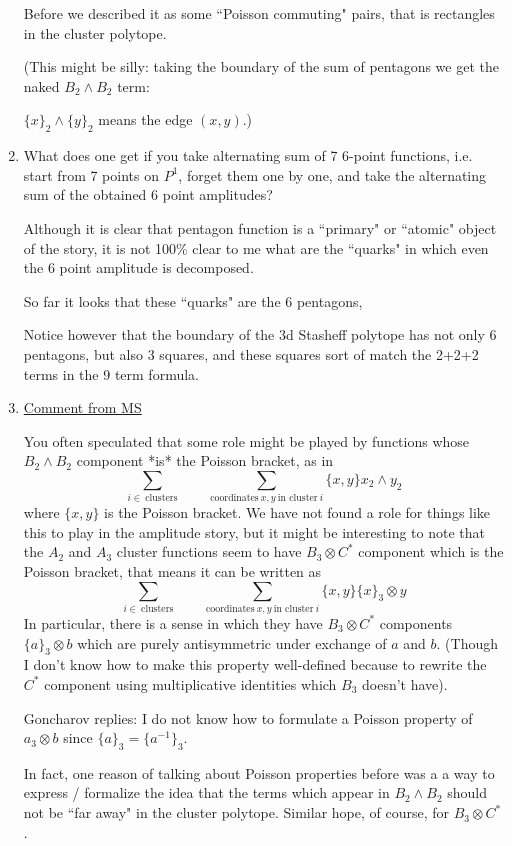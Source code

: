 \documentclass[12pt]{article}
\begin{document}
\begin{enumerate}
Before we described it as some ``Poisson commuting" pairs, that is
rectangles in the cluster polytope.

(This might be silly: taking the boundary of the sum of
pentagons we get the naked $B_2\wedge B_2$ term:

$\{x\}_2 \wedge \{y\}_2$ means the edge $(x,y)$.)

\item What does one get if you take alternating sum of
7 6-point functions, i.e. start from 7 points on $P^1$, forget them one
by one, and take the alternating sum of the obtained 6 point amplitudes?

Although it is clear that pentagon function is a
``primary" or ``atomic" object of the story,
it is not 100\% clear to me what are the ``quarks"
in which even the 6 point amplitude is decomposed.

So far it looks that these ``quarks" are the 6 pentagons,

Notice however that the boundary of the 3d Stasheff polytope has
not only 6 pentagons, but also 3 squares, and these squares
sort of match the 2+2+2 terms in the 9 term formula.

\item \underline{Comment from MS}

You often speculated that some role might be played by functions whose $B_2 \wedge B_2$ component *is*
the Poisson bracket, as in
$$
\sum_{i \in~\text{clusters}} \qquad \sum_{\text{coordinates}~x, y~\text{in cluster}~i} \{x,y\} {x}_2
\wedge {y}_2
$$
where $\{x,y\}$ is the Poisson bracket.  We have not found a role for
things like this to play in the amplitude story, but it might be
interesting to note that the $A_2$ and $A_3$ cluster functions seem to have
$B_3 \otimes C^*$ component which is the Poisson bracket, that means it
can be written as
$$
\sum_{i \in~\text{clusters}} \qquad \sum_{\text{coordinates}~x, y~\text{in cluster}~i} \{x,y\}
\{x\}_3 \otimes y
$$
In particular, there is a sense in which they have $B_3 \otimes C^*$
components $\{a\}_3 \otimes b$ which are purely antisymmetric under
exchange of $a$ and $b$.  (Though I don't know how to make this property
well-defined because to rewrite the $C^*$ component using multiplicative
identities which $B_3$ doesn't have).

Goncharov replies:  I do not know how to formulate a Poisson property of ${a}_3 \otimes b$
since $\{a\}_3 = \{a^{-1}\}_3$. 

In fact, one reason of talking about Poisson properties before was a
a  way to express / formalize  the idea that
the terms which appear in $B_2 \wedge B_2$ should not be ``far away" in
the cluster polytope. Similar hope, of course, for $B_3 \otimes C^*$.


\end{enumerate}
\end{document}
